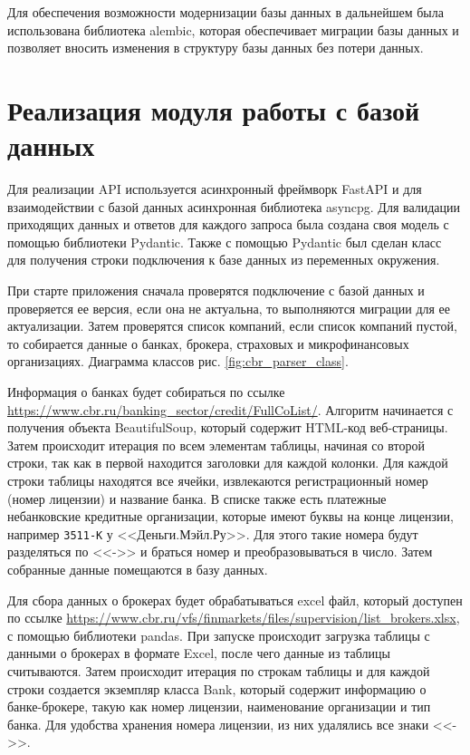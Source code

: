 \documentclass[PI, VKR]{HSEUniversity}
\begin{document}
Для обеспечения возможности модернизации базы данных в дальнейшем была использована библиотека alembic, которая обеспечивает миграции базы данных и позволяет вносить изменения в структуру базы данных без потери данных.
\section{Реализация модуля работы с базой данных}
\label{sec:org77ac959}
Для реализации API используется асинхронный фреймворк FastAPI и для взаимодействии с базой данных асинхронная библиотека asyncpg. Для валидации приходящих данных и ответов для каждого запроса была создана своя модель с помощью библиотеки Pydantic. Также с помощью Pydantic был сделан класс для получения строки подключения к базе данных из переменных окружения.

При старте приложения сначала проверятся подключение с базой данных и проверяется ее версия, если она не актуальна, то выполняются миграции для ее актуализации. Затем проверятся список компаний, если список компаний пустой, то собирается данные о банках, брокера, страховых и микрофинансовых организациях. Диаграмма классов рис. \ref{fig:cbr_parser_class}.

Информация о банках будет собираться по ссылке \url{https://www.cbr.ru/banking\_sector/credit/FullCoList/}. Алгоритм начинается с получения объекта BeautifulSoup\autocite{richardsonleonard_beautiful_2007}, который содержит HTML-код веб-страницы. Затем происходит итерация по всем элементам таблицы, начиная со второй строки, так как в первой находится заголовки для каждой колонки. Для каждой строки таблицы находятся все ячейки, извлекаются регистрационный номер (номер лицензии) и название банка. В списке также есть платежные небанковские кредитные организации, которые имеют буквы на конце лицензии, например \texttt{3511-К} у {}<<Деньги.Мэйл.Ру>>{}. Для этого такие номера будут разделяться по {}<<->>{} и браться номер и преобразовываться в число. Затем собранные данные помещаются в базу данных.

Для сбора данных о брокерах будет обрабатываться excel файл, который доступен по ссылке \url{https://www.cbr.ru/vfs/finmarkets/files/supervision/list\_brokers.xlsx}, с помощью библиотеки pandas\autocite{team_pandas-devpandas_2023}. При запуске происходит загрузка таблицы с данными о брокерах в формате Excel, после чего данные из таблицы считываются. Затем происходит итерация по строкам таблицы и для каждой строки создается экземпляр класса Bank, который содержит информацию о банке-брокере, такую как номер лицензии, наименование организации и тип банка. Для удобства хранения номера лицензии, из них удалялись все знаки {}<<->>{}.
\end{document}
